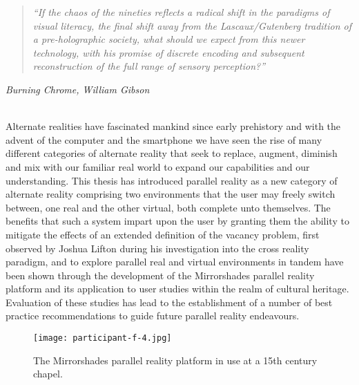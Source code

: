 
\begin{quote}
	\textit{``If the chaos of the nineties reflects a radical shift in the paradigms of visual literacy, the final shift away from the Lascaux/Gutenberg tradition of a pre-holographic society, what should we expect from this newer technology, with his promise of discrete encoding and subsequent reconstruction of the full range of sensory perception?''}
\end{quote}
\hfill \textit{Burning Chrome, William Gibson}
\\
\\


\label{chapter-conclusions}

Alternate realities have fascinated mankind since early prehistory and with the advent of the computer and the smartphone we have seen the rise of many different categories of alternate reality that seek to replace, augment, diminish and mix with our familiar real world to expand our capabilities and our understanding. This thesis has introduced parallel reality as a new category of alternate reality comprising two environments that the user may freely switch between, one real and the other virtual, both complete unto themselves. The benefits that such a system impart upon the user by granting them the ability to mitigate the effects of an extended definition of the vacancy problem, first observed by Joshua Lifton during his investigation into the cross reality paradigm, and to explore parallel real and virtual environments in tandem have been shown through the development of the Mirrorshades parallel reality platform and its application to user studies within the realm of cultural heritage. Evaluation of these studies has lead to the establishment of a number of best practice recommendations to guide future parallel reality endeavours.

\begin{figure}[t]
	\begin{center}
		\texttt{[image: participant-f-4.jpg]}
		\caption{The Mirrorshades parallel reality platform in use at a 15th century chapel.}
		\label{participant-f-4.jpg}
	\end{center}	
\end{figure}

